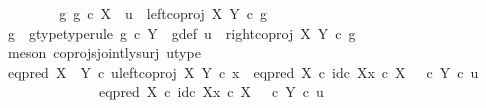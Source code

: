 \begin{isabellebody}
\isanewline
\ \ \isamarkupfalse%
\isanewline
\ \ \ \ \isamarkupfalse%
\ {\isachardoublequoteopen}{\isasymnexists}g{\isachardot}{\kern0pt}\ g\ {\isasymin}\isactrlsub c\ X\ {\isasymand}\ u\ {\isacharequal}{\kern0pt}\ left{\isacharunderscore}{\kern0pt}coproj\ X\ Y\ {\isasymcirc}\isactrlsub c\ g{\isachardoublequoteclose}\isanewline
\ \ \ \ \isamarkupfalse%
\ \isamarkupfalse%
\ g\ \ g{\isacharunderscore}{\kern0pt}type{\isacharbrackleft}{\kern0pt}type{\isacharunderscore}{\kern0pt}rule{\isacharbrackright}{\kern0pt}{\isacharcolon}{\kern0pt}\ {\isachardoublequoteopen}g\ {\isasymin}\isactrlsub c\ Y{\isachardoublequoteclose}\ \ g{\isacharunderscore}{\kern0pt}def{\isacharcolon}{\kern0pt}\ {\isachardoublequoteopen}u\ {\isacharequal}{\kern0pt}\ right{\isacharunderscore}{\kern0pt}coproj\ X\ Y\ {\isasymcirc}\isactrlsub c\ g{\isachardoublequoteclose}\isanewline
\ \ \ \ \ \ \isamarkupfalse%
\ {\isacharparenleft}{\kern0pt}meson\ coprojs{\isacharunderscore}{\kern0pt}jointly{\isacharunderscore}{\kern0pt}surj\ u{\isacharunderscore}{\kern0pt}type{\isacharparenright}{\kern0pt}\isanewline
\isanewline
\ \ \ \ \isamarkupfalse%
\ {\isachardoublequoteopen}eq{\isacharunderscore}{\kern0pt}pred\ {\isacharparenleft}{\kern0pt}X\ {\isasymCoprod}\ Y{\isacharparenright}{\kern0pt}\ {\isasymcirc}\isactrlsub c\ {\isasymlangle}u{\isacharcomma}{\kern0pt}left{\isacharunderscore}{\kern0pt}coproj\ X\ Y\ {\isasymcirc}\isactrlsub c\ x{\isasymrangle}\ {\isacharequal}{\kern0pt}\ {\isacharparenleft}{\kern0pt}eq{\isacharunderscore}{\kern0pt}pred\ X\ {\isasymcirc}\isactrlsub c\ {\isasymlangle}id\isactrlsub c\ X{\isacharcomma}{\kern0pt}x\ {\isasymcirc}\isactrlsub c\ {\isasymbeta}\isactrlbsub X\isactrlesub {\isasymrangle}{\isacharparenright}{\kern0pt}\ {\isasymamalg}\ {\isacharparenleft}{\kern0pt}{\isasymf}\ {\isasymcirc}\isactrlsub c\ {\isasymbeta}\isactrlbsub Y\isactrlesub {\isacharparenright}{\kern0pt}\ {\isasymcirc}\isactrlsub c\ u{\isachardoublequoteclose}\ \ \isanewline
\ \ \ \ \isamarkupfalse%
\ {\isacharminus}{\kern0pt}\isanewline
\ \ \ \ \ \ \isamarkupfalse%
\ {\isachardoublequoteopen}{\isacharparenleft}{\kern0pt}eq{\isacharunderscore}{\kern0pt}pred\ X\ {\isasymcirc}\isactrlsub c\ {\isasymlangle}id\isactrlsub c\ X{\isacharcomma}{\kern0pt}x\ {\isasymcirc}\isactrlsub c\ {\isasymbeta}\isactrlbsub X\isactrlesub {\isasymrangle}{\isacharparenright}{\kern0pt}\ {\isasymamalg}\ {\isacharparenleft}{\kern0pt}{\isasymf}\ {\isasymcirc}\isactrlsub c\ {\isasymbeta}\isactrlbsub Y\isactrlesub {\isacharparenright}{\kern0pt}\ {\isasymcirc}\isactrlsub c\ u\isanewline

\end{isabellebody}
